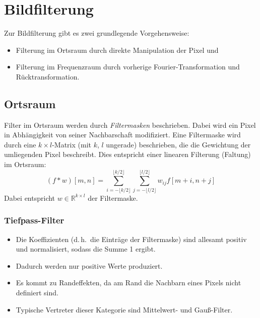 \documentclass[a4paper, 11pt, accentcolor = tud3b]{tudreport}
\newcommand{\R}{\mathbb{R}}
\renewcommand{\dh}{d.\,h.~}
\begin{document}
		\section{Bildfilterung}
			Zur Bildfilterung gibt es zwei grundlegende Vorgehensweise:
			\begin{itemize}
				\item Filterung im Ortsraum durch direkte Manipulation der Pixel und
				\item Filterung im Frequenzraum durch vorherige Fourier-Transformation und Rücktransformation.
			\end{itemize}

			\subsection{Ortsraum}
				Filter im Ortsraum werden durch \emph{Filtermasken} beschrieben. Dabei wird ein Pixel in Abhängigkeit von seiner Nachbarschaft modifiziert. Eine Filtermaske wird durch eine \( k \times l \)-Matrix (mit \(k\), \(l\) ungerade) beschrieben, die die Gewichtung der umliegenden Pixel beschreibt. Dies entspricht einer linearen Filterung (Faltung) im Ortsraum:
				\begin{equation*}
					(f \ast w)[m, n] = \sum_{i = -\lfloor k/2 \rfloor}^{\lfloor k/2 \rfloor} \sum_{j = -\lfloor l/2 \rfloor}^{\lfloor l/2 \rfloor} w_{ij} f[m + i, n + j]
				\end{equation*}
				Dabei entspricht \( w \in \R^{k \times l} \) der Filtermaske.

				\subsubsection{Tiefpass-Filter}
					\begin{itemize}
						\item Die Koeffizienten (\dh die Einträge der Filtermaske) sind allesamt positiv und normalisiert, sodass die Summe \num{1} ergibt.
						\item Dadurch werden nur positive Werte produziert.
						\item Es kommt zu Randeffekten, da am Rand die Nachbarn eines Pixels nicht definiert sind.
						\item Typische Vertreter dieser Kategorie sind Mittelwert- und Gauß-Filter.
					\end{itemize}
\end{document}
